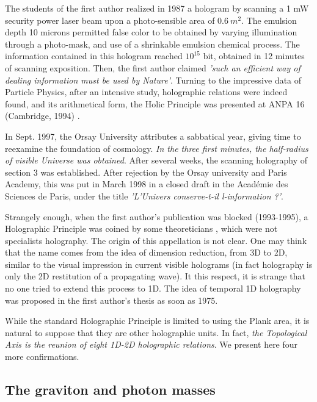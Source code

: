 \documentclass[twoside,draft]{article}
\begin{document}
\begin{sloppypar}
The students of the first author realized in 1987 a hologram by scanning a 1 mW security power laser beam upon a photo-sensible area of $0.6~ m^2$. The emulsion depth 10 microns permitted false color to be obtained by varying illumination through a photo-mask, and use of a shrinkable emulsion chemical process. The information contained in this hologram reached $10^{15}$ bit, obtained in 12 minutes of scanning exposition. Then, the first author claimed \textit{'such an efficient way of dealing information must be used by Nature'}. Turning to the impressive data of Particle Physics, after an intensive study, holographic relations were indeed found, and its arithmetical form, the Holic Principle was presented at ANPA 16 (Cambridge, 1994) \cite{Sanchez4}. 

In Sept. 1997, the Orsay University attributes a sabbatical year, giving time to reexamine the foundation of cosmology. \textit{In the three first minutes, the half-radius of visible Universe was obtained}. After several weeks, the scanning holography of section 3 was established. After rejection by the Orsay university and Paris Academy, this was put in March 1998 in a closed draft in the Acad\'{e}mie des Sciences de Paris, under the title \textit{ 'L'Univers conserve-t-il l-information ?'}.

Strangely enough, when the first author's publication was blocked (1993-1995), a Holographic Principle was coined by some theoreticians \cite{Bousso}, which were not specialists holography. The origin of this appellation is not clear. One may think that the name comes from the idea of dimension reduction, from 3D to 2D, similar to the visual impression in current visible holograms (in fact holography is only the 2D restitution of a propagating wave). It this respect, it is strange that no one tried to extend this process to 1D. The idea of temporal 1D holography was proposed in the first author's thesis as soon as 1975. 

While the standard Holographic Principle is limited to using the Plank area, it is natural to suppose that they are other holographic units. In fact, \textit{the Topological Axis is the reunion of eight 1D-2D holographic relations}. We present here four more confirmations. 

\subsection{The graviton and photon masses}


\end{sloppypar}
\end{document}
